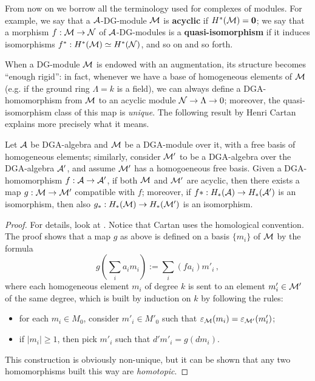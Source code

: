 	From now on we borrow all the terminology used for complexes of modules. 
	For example, we say that a $\mathcal{A}$-DG-module $\mathcal{M}$ is \textbf{acyclic} 
	if $H^{*}(\mathcal{M}) = {\normalfont\textbf{0}}$;
	we say that a morphism $f:\mathcal{M} \to \mathcal{N}$ of $\mathcal{A}$-DG-modules 
	is a \textbf{quasi-isomorphism} if it induces isomorphisms 
	$f^*:H^{*}(\mathcal{M}) \simeq H^{*}(\mathcal{N})$, and so on and so forth.
	
	When a DG-module $\mathcal{M}$ is endowed with an augmentation,
	its structure becomes ``enough rigid'': in fact,
	whenever we have a base of homogeneous elements of $\mathcal{M}$
	(e.g. if the ground ring $\Lambda = k$ is a field),
	we can always define a DGA-homomorphism from $\mathcal{M}$
	to an acyclic module $\mathcal{N} \to \Lambda \to 0$; moreover, the quasi-isomorphism
	class of this map is \emph{unique}.
	The following result by Henri Cartan explains more precisely
	what it means.
	
	\begin{thm}
		Let $\mathcal{A}$ be DGA-algebra and $\mathcal{M}$ be a DGA-module over it, 
		with a free basis of homogeneous elements; similarly,
		consider $\mathcal{M}'$ to be a DGA-algebra over the DGA-algebra $\mathcal{A}'$,
		and assume $\mathcal{M}'$ has a homogoeneous free basis.
		Given a DGA-homomorphism $f:\mathcal{A} \to \mathcal{A}'$,
		if both $\mathcal{M}$ and $\mathcal{M}'$ are acyclic, then there exists
		a map $g:\mathcal{M} \to \mathcal{M}'$ compatible with $f$; moreover,
		if $f*:H_{*}(\mathcal{A}) \to H_{*}(\mathcal{A}')$ is an isomorphism,
		then also $g_{*}:H_{*}(\mathcal{M}) \to H_{*}(\mathcal{M}')$ is an isomorphism.
		\begin{proof}
			For details, look at \parencite{cartanDGA}.
			Notice that Cartan uses the homological convention.
			The proof shows that a map $g$ as above is defined
			on a basis $\{m_{i}\}$ of $\mathcal{M}$ by the formula
			\begin{equation*}
				g\left( \sum_{i} a_{i} m_{i} \right) 
				:= \sum_{i} (fa_{i}) m'_{i}\,,
			\end{equation*}
			where each homogeneous element $m_{i}$ of degree $k$
			is sent to an element $m'_{i} \in \mathcal{M}'$ of the same degree,
			which is built by induction on $k$ by following the rules:
			\begin{itemize}
				\item for each $m_{i} \in M_{0}$, consider $m'_{i} \in M'_{0}$
				such that $\varepsilon_{\mathcal{M}}(m_{i}) = \varepsilon_{\mathcal{M}'}(m'_{i})$;
				\item if $|m_{i}| \ge 1$, then pick $m'_{i}$ such that
				$d'm'_{i} = g(dm_{i})$.
			\end{itemize}
			This construction is obviously non-unique, but it can be
			shown that any two
			homomorphisms built this way are \emph{homotopic}.
		\end{proof}
	\end{thm}
	
